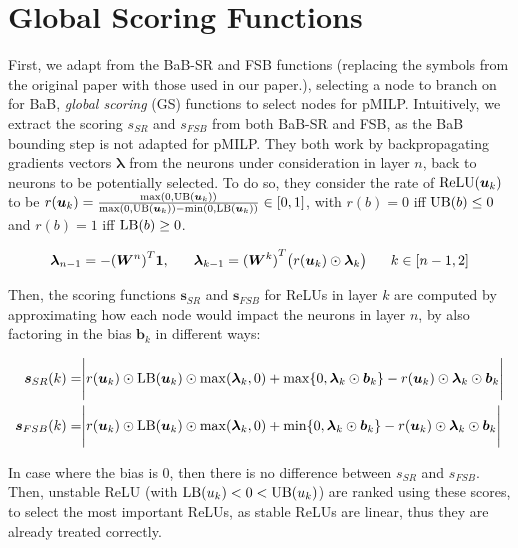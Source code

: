 \section{Global Scoring Functions}

\label{sec4p5}

First, we adapt from the BaB-SR \cite{BaB} and FSB \cite{FSB} functions (replacing the symbols from the original paper with those used in our paper.), selecting a node to branch on for BaB, {\em  global scoring} (GS) functions to select nodes for pMILP. Intuitively, we extract the scoring $s_{SR}$ and $s_{FSB}$ from both BaB-SR and FSB, as the BaB bounding step is not adapted for pMILP. They both work by backpropagating gradients vectors $\bm{\lambda}$ from the neurons under consideration in layer $n$, back to neurons to be potentially selected. To do so, they consider the rate of $\mathrm{ReLU}(\bm{u}_k)$ to be 
$r(\bm{u}_k)=\frac{\max(0,\mathrm{UB}(\bm{u}_k))}{\max(0,\mathrm{UB}(\bm{u}_k))-\min(0,\mathrm{LB}(\bm{u}_k))} \in [0,1]$, 
with $r(b)=0$ iff $\mathrm{UB}(b)\leq 0$ and $r(b)=1$ iff $\mathrm{LB}(b)\geq 0$.

\begin{align*}
\bm{\lambda}_{n-1} = -{(\bm{W}^n)}^T\bm{1}, \hspace*{4ex}  	\bm{\lambda}_{k-1} = {(\bm{W}^k)}^T\big( r(\bm{u}_k) \odot\bm{\lambda}_{k}\big) \hspace*{4ex}  k\in [n-1,2]
\end{align*}


Then, the scoring functions $\bm{s}_{SR}$ and $\bm{s}_{FSB}$ for ReLUs in layer $k$ are computed by approximating how each node would impact the neurons in layer $n$, by also factoring in the bias $\bm{b}_k$ in different ways:

\begin{align*}
	\bm{s}_{SR}(k) =& %
	\Biggl\lvert r(\bm{u}_k) \odot \LB(\bm{u}_k) \odot \max(\bm{\lambda}_{k},0)
	+ \max\{0,\bm{\lambda}_{k}\odot\bm{b}_{k}\}-r(\bm{u}_k) \odot\bm{\lambda}_{k}\odot\bm{{b}}_{k}
	\Biggr\rvert  \\
	\bm{s}_{FSB}(k) =& \Biggl\lvert r(\bm{u}_k) \odot \LB(\bm{u}_k) \odot \max(\bm{\lambda}_{k},0)
	+ \min\{0,\bm{\lambda}_{k}\odot\bm{b}_{k}\}-r(\bm{u}_k) \odot\bm{\lambda}_{k}\odot\bm{{b}}_{k}
	\Biggr\rvert
\end{align*}

In case where the bias is 0, then there is no difference between $s_{SR}$ and $s_{FSB}$.
Then, unstable ReLU (with $\mathrm{LB}(u_k) < 0 < \mathrm{UB}(u_k)$) are ranked using these scores, to select the most important ReLUs, as stable ReLUs are linear, thus they are already treated correctly.


